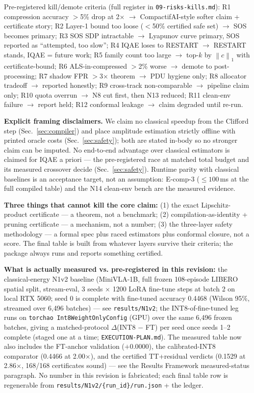\documentclass[conference,10pt]{IEEEtran}
\newcommand{\norm}[1]{\left\lVert #1 \right\rVert}
\begin{document}
Pre-registered kill/demote criteria (full register in
\texttt{09-risks-kills.md}): R1 compression accuracy $>$5\% drop at 2$\times$
$\rightarrow$ CompactifAI-style softer claim + certificate story; R2 Layer-1
bound too loose ($<$50\% certified safe set) $\rightarrow$ SOS becomes primary;
R3 SOS SDP intractable $\rightarrow$ Lyapunov curve primary, SOS reported as
``attempted, too slow''; R4 IQAE loses to RESTART $\rightarrow$ RESTART stands,
IQAE = future work; R5 family count too large $\rightarrow$ top-$k$ by
$\norm{c}_1$ with certificate-bound; R6 ALS-in-compressed $>$2\% worse
$\rightarrow$ demote to post-processing; R7 shadow FPR $>$3$\times$ theorem
$\rightarrow$ PDU hygiene only; R8 allocator tradeoff $\rightarrow$ reported
honestly; R9 cross-track non-comparable $\rightarrow$ pipeline claim only;
R10 quota overrun $\rightarrow$ N8 cut first, then N13 reduced; R11 clean-env
failure $\rightarrow$ report held; R12 conformal leakage $\rightarrow$ claim
degraded until re-run.

\textbf{Explicit framing disclaimers.} We claim no classical speedup from the
Clifford step (Sec.~\ref{sec:compiler}) and place amplitude estimation strictly
offline with printed oracle costs (Sec.~\ref{sec:safety}); both are stated
in-body so no stronger claim can be imputed. No end-to-end advantage over
classical estimators is claimed for IQAE a priori --- the pre-registered race
at matched total budget and its measured crossover decide (Sec.~\ref{sec:safety}).
Runtime parity with classical baselines is an acceptance target, not an
assumption: E-comp-3 ($\le 100$\,ms at the full compiled table) and the N14
clean-env bench are the measured evidence.

\textbf{Three things that cannot kill the core claim:} (1) the exact
Lipschitz-product certificate --- a theorem, not a benchmark; (2)
compilation-as-identity + pruning certificate --- a mechanism, not a number;
(3) the three-layer safety methodology --- a formal spec plus raced estimators
plus conformal closure, not a score. The final table is built from whatever
layers survive their criteria; the package always runs and reports something
certified.

\textbf{What is actually measured vs. pre-registered in this revision:} the
classical-energy N1v2 baseline (MiniVLA-1B, full frozen 108-episode LIBERO
spatial split, stream-eval, 3 seeds $\times$ 1200 LoRA fine-tune steps at
batch 2 on local RTX 5060; seed 0 is complete with fine-tuned accuracy
0.4468 (Wilson 95\%, streamed over 6{,}496
batches) --- see \texttt{results/N1v2}; the INT8-of-fine-tuned leg runs on
\texttt{torchao Int8WeightOnlyConfig} (GPU) over the same 6{,}496 frozen
batches, giving a matched-protocol $\Delta$(INT8 $-$ FT) per seed once seeds
1--2 complete (staged one at a time; \texttt{EXECUTION-PLAN.md}). The
measured table now also includes the FT-anchor validation ($+0.0000$), the
calibrated-INT8 comparator (0.4466 at 2.00$\times$), and the certified
TT+residual verdicts (0.1529 at 2.86$\times$, 168/168 certificates sound) ---
see the Results Framework measured-status paragraph. No number in this revision is fabricated; each final table row
is regenerable from \texttt{results/N1v2/\{run\_id\}/run.json} + the ledger.
\end{document}
